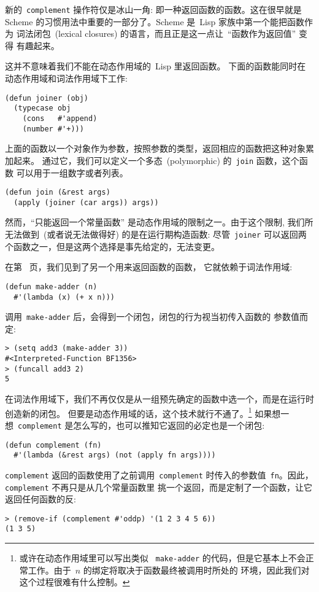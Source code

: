 新的~\texttt{complement} 操作符仅是冰山一角: 即一种返回函数的函数。这在很早就是~
Scheme 的习惯用法中重要的一部分了。Scheme 是~Lisp 家族中第一个能把函数作为
词法闭包~(lexical closures) 的语言，而且正是这一点让~``函数作为返回值'' 变得
有趣起来。

这并不意味着我们不能在动态作用域的~Lisp 里返回函数。
下面的函数能同时在动态作用域和词法作用域下工作:
\begin{lstlisting}
(defun joiner (obj)
  (typecase obj
    (cons   #'append)
    (number #'+)))
\end{lstlisting}
上面的函数以一个对象作为参数，按照参数的类型，返回相应的函数把这种对象累加起来。
通过它，我们可以定义一个多态~(polymorphic) 的~\verb|join| 函数，这个函数
可以用于一组数字或者列表。
\begin{lstlisting}
(defun join (&rest args)
  (apply (joiner (car args)) args))
\end{lstlisting}
然而，``只能返回一个常量函数'' 是动态作用域的限制之一。由于这个限制,
我们所无法做到~(或者说无法做得好) 的是在运行期构造函数: 尽管~\verb|joiner| 
可以返回两个函数之一，但是这两个选择是事先给定的，无法变更。

在第~\pageref{fun:make-adder} 页，我们见到了另一个用来返回函数的函数，
它就依赖于词法作用域:
\begin{lstlisting}
(defun make-adder (n)
  #'(lambda (x) (+ x n)))
\end{lstlisting}
调用~\verb|make-adder| 后，会得到一个闭包，闭包的行为视当初传入函数的
参数值而定:
\begin{lstlisting}
> (setq add3 (make-adder 3))
#<Interpreted-Function BF1356>
> (funcall add3 2)
5
\end{lstlisting}
在词法作用域下，我们不再仅仅是从一组预先确定的函数中选一个，而是在运行时创造新的闭包。
但要是动态作用域的话，这个技术就行不通了。\footnote{或许在动态作用域里可以写出类似
~\texttt{make-adder} 的代码，但是它基本上不会正常工作。由于~$n$ 的绑定将取决于函数最终被调用时所处的
环境，因此我们对这个过程很难有什么控制。}
如果想一想~\verb|complement| 是怎么写的，也可以推知它返回的必定也是一个闭包:
\begin{lstlisting}
(defun complement (fn)
  #'(lambda (&rest args) (not (apply fn args))))
\end{lstlisting}
\texttt{complement} 返回的函数使用了之前调用~\texttt{complement} 
时传入的参数值~\texttt{fn}。因此，\texttt{complement} 不再只是从几个常量函数里
挑一个返回，而是定制了一个函数，让它返回任何函数的反:
\begin{lstlisting}
> (remove-if (complement #'oddp) '(1 2 3 4 5 6))
(1 3 5)
\end{lstlisting}


